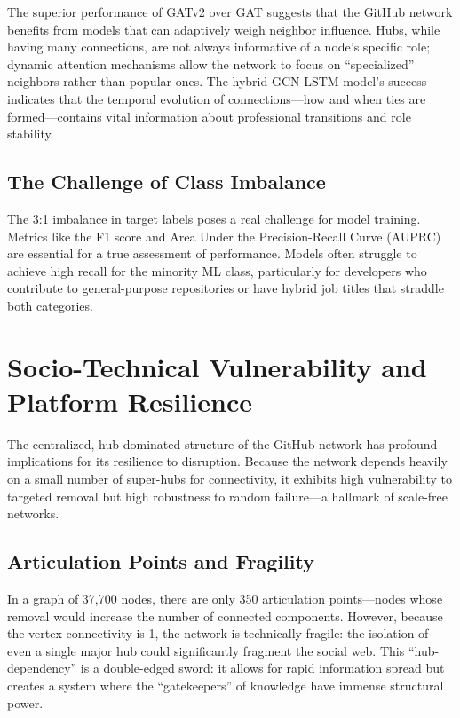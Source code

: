 \documentclass[letterpaper]{article}
\begin{document}
The superior performance of GATv2 over GAT suggests that the GitHub network benefits from models that can adaptively weigh neighbor influence. Hubs, while having many connections, are not always informative of a node's specific role; dynamic attention mechanisms allow the network to focus on ``specialized'' neighbors rather than popular ones. The hybrid GCN-LSTM model's success indicates that the temporal evolution of connections---how and when ties are formed---contains vital information about professional transitions and role stability.

\subsection{The Challenge of Class Imbalance}

The 3:1 imbalance in target labels poses a real challenge for model training. Metrics like the F1 score and Area Under the Precision-Recall Curve (AUPRC) are essential for a true assessment of performance. Models often struggle to achieve high recall for the minority ML class, particularly for developers who contribute to general-purpose repositories or have hybrid job titles that straddle both categories.

\section{Socio-Technical Vulnerability and Platform Resilience}

The centralized, hub-dominated structure of the GitHub network has profound implications for its resilience to disruption. Because the network depends heavily on a small number of super-hubs for connectivity, it exhibits high vulnerability to targeted removal but high robustness to random failure---a hallmark of scale-free networks.

\subsection{Articulation Points and Fragility}

In a graph of 37,700 nodes, there are only 350 articulation points---nodes whose removal would increase the number of connected components. However, because the vertex connectivity is 1, the network is technically fragile: the isolation of even a single major hub could significantly fragment the social web. This ``hub-dependency'' is a double-edged sword: it allows for rapid information spread but creates a system where the ``gatekeepers'' of knowledge have immense structural power.
\end{document}
